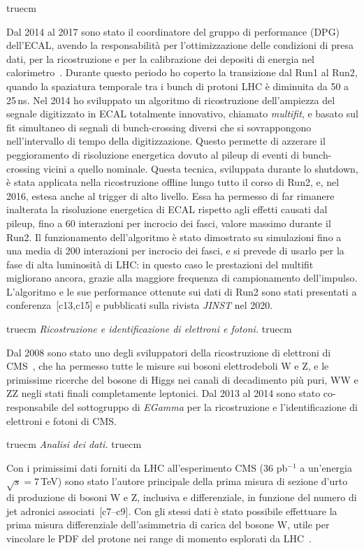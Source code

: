 \documentclass[11pt,twoside,a4paper]{article}
\begin{document}
 truecm

Dal 2014 al 2017 sono stato il coordinatore del gruppo di performance
(DPG) dell'ECAL, avendo la responsabilit\`a per l'ottimizzazione delle
condizioni di presa dati, per la ricostruzione e per la calibrazione
dei depositi di energia nel
calorimetro~\cite{Khachatryan:2015iwa}. Durante questo periodo ho
coperto la transizione dal Run1 al Run2, quando la spaziatura
temporale tra i bunch di protoni LHC \`e diminuita da 50 a 25\,ns. Nel
2014 ho sviluppato un algoritmo di ricostruzione dell'ampiezza del
segnale digitizzato in ECAL totalmente innovativo, chiamato
\textit{multifit}, e basato sul fit simultaneo di segnali di
bunch-crossing diversi che si sovrappongono nell'intervallo di tempo
della digitizzazione.  Questo permette di azzerare il peggioramento di
risoluzione energetica dovuto al pileup di eventi di bunch-crossing
vicini a quello nominale.  Questa tecnica, sviluppata durante lo
shutdown, \`e stata applicata nella ricostruzione offline lungo tutto
il corso di Run2, e, nel 2016, estesa anche al trigger di alto
livello.  Essa ha permesso di far rimanere inalterata la risoluzione
energetica di ECAL rispetto agli effetti causati dal pileup, fino a 60
interazioni per incrocio dei fasci, valore massimo durante il Run2.
Il funzionamento dell'algoritmo \`e stato dimostrato su simulazioni
fino a una media di 200 interazioni per incrocio dei fasci, e si
prevede di usarlo per la fase di alta luminosit\`a di LHC: in questo
caso le prestazioni del multifit migliorano ancora, grazie alla
maggiore frequenza di campionamento dell'impulso. L'algoritmo e le sue
performance ottenute sui dati di Run2 sono stati presentati a
conferenza~[c13,c15] e pubblicati sulla rivista \textit{JINST} nel
2020.

 truecm
\textit{Ricostruzione e identificazione di elettroni e fotoni.}
 truecm

Dal 2008 sono stato uno degli sviluppatori della ricostruzione di
elettroni di CMS~\cite{Khachatryan:2015hwa}, che ha permesso tutte le
misure sui bosoni elettrodeboli W e Z, e le primissime ricerche del
bosone di Higgs nei canali di decadimento pi\`u puri, WW e ZZ negli
stati finali completamente leptonici. Dal 2013 al 2014 sono stato
co-responsabile del sottogruppo di \textit{EGamma} per la
ricostruzione e l'identificazione di elettroni e fotoni di CMS.

 truecm
\textit{Analisi dei dati.}
 truecm

Con i primissimi dati forniti da LHC all'esperimento CMS (36 pb$^{-1}$
a un'energia $\sqrt{s}=7$\,TeV) sono stato l'autore principale della
prima misura di sezione d'urto di produzione di bosoni W e Z,
inclusiva e differenziale, in funzione del numero di jet adronici
associati~\cite{Chatrchyan:2011ne,Marco:2009dvd,Khachatryan:2010xn,CMS:2011aa}[c7--c9].
Con gli stessi dati \`e stato possibile effettuare la prima misura
differenziale dell'asimmetria di carica del bosone W, utile per
vincolare le PDF del protone nei range di momento esplorati da
LHC~\cite{Chatrchyan:2011jz}.
\end{document}
